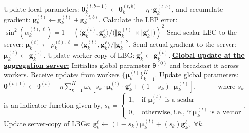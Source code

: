 \documentclass{article}
\renewcommand{\vec}[3]{\boldsymbol{#1}_{#2}^{#3}}
\newcommand{\subsup}[3]{#1_{#2}^{#3}}
\newcommand{\innorm}[2]{\Vert #1\Vert_{#2}}
\newcommand{\indotp}[2]{\langle #1, #2 \rangle}
\begin{document}
\begin{algorithm}[t]
{\begin{algorithmic}[1]
        \State Update local parameters: $\vec{\theta}{k}{(t, b+1)} \leftarrow \vec{\theta}{k}{(t, b)} - \eta \cdot \vec{g}{k}{(t, b)}$, and accumulate gradient: $\vec{g}{k}{(t)} \leftarrow \vec{g}{k}{(t)} + \vec{g}{k}{(t,b)}$.
    \EndFor
        \State Calculate the LBP error:  $ \sin^2(\subsup{\alpha}{k}{(t), \ell}) = 1 - \left( \indotp{ \vec{g}{k}{(t)} }{ \vec{g}{k}{\ell}}  \big/ \big(\innorm{ \vec{g}{k}{(t)} }{} \times \innorm{ \vec{g}{k}{\ell} }{} \big) \right)^2$ \label{line:lbp}
    \If{ $\sin^2(\subsup{\alpha}{k}{(t), \ell}) \leq \subsup{\delta}{k}{\mathsf{threshold}}$ } \label{line:lbp_cond} 
        \State Send scalar LBC to the server: $\vec{\mu}{k}{(t)} \leftarrow \subsup{\rho}{k}{(t),\ell} = \indotp{ \vec{g}{k}{(t)} }{ \vec{g}{k}{\ell} }/\innorm{ \vec{g}{k}{\ell} }{}^2$.
    \Else {}
        \State Send actual gradient to the server: $\vec{\mu}{k}{(t)} \leftarrow \vec{g}{k}{(t)}$. \label{line:update1}
        \State Update worker-copy of LBG: $\vec{g}{k}{\ell} \leftarrow \vec{g}{k}{(t)}$. \label{line:update2}
    \EndIf
    \Statex \textbf{\underline{Global update at the aggregation server:}}
    \State Initialize global parameter $\vec{\theta}{}{(0)}$ and broadcast it across workers.
        \State Receive updates from workers $\{ \vec{\mu}{k}{(t)} \}_{k=1}^{K}$.
        \State Update global parameters: $\vec{\theta}{}{(t+1)} \leftarrow \vec{\theta}{}{(t)} - \eta \sum_{k=1}^{K}\omega_k \left[ s_k \cdot  \vec{\mu}{k}{(t)} \cdot \vec{g}{k}{\ell} + (1-s_k)\cdot \vec{\mu}{k}{(t)}\right]$, 
        \Statex ~~~~~~where $s_k$ is an indicator function given by, $s_k = \begin{cases} 1, \quad \text{if } 
        \vec{\mu}{k}{(t)}\text{ is a scalar} \\
        0, \quad \text{otherwise, i.e., if }\vec{\mu}{k}{(t)}\text{ is a vector} \end{cases}$.
        \State Update server-copy of LBGs: $ \vec{g}{k}{\ell} \leftarrow (1-s_k) \vec{\mu}{k}{(t)} + (s_k) \vec{g}{k}{\ell },~~\forall k$.
    \EndFor
\end{algorithmic}
}
\end{algorithm}
\end{document}
